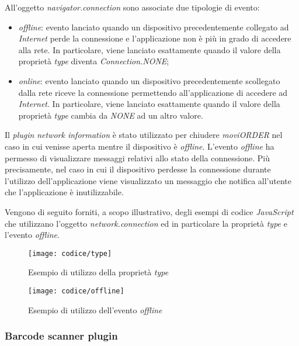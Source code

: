 All'oggetto \textit{navigator.connection} sono associate due tipologie di evento:
\begin{itemize}
	\item \textit{offline}: evento lanciato quando un dispositivo precedentemente collegato ad \textit{Internet} perde la connessione e l'applicazione non è più in grado di accedere alla rete. In particolare, viene lanciato esattamente quando il valore della proprietà \textit{type} diventa \textit{Connection.NONE};
	\item \textit{online}: evento lanciato quando un dispositivo precedentemente scollegato dalla rete riceve la connessione permettendo all'applicazione di accedere ad \textit{Internet}. In particolare, viene lanciato esattamente quando il valore della proprietà \textit{type} cambia da \textit{NONE} ad un altro valore.
\end{itemize}
Il \textit{plugin} \textit{network information} è stato utilizzato per chiudere \textit{moviORDER} nel caso in cui venisse aperta mentre il dispositivo è \textit{offline}. L'evento \textit{offline} ha permesso di visualizzare messaggi relativi allo stato della connessione. Più precisamente, nel caso in cui il dispositivo perdesse la connessione durante l'utilizzo dell'applicazione viene visualizzato un messaggio che notifica all'utente che l'applicazione è inutilizzabile.

Vengono di seguito forniti, a scopo illustrativo, degli esempi di codice \textit{JavaScript} che utilizzano l'oggetto \textit{network.connection} ed in particolare la proprietà \textit{type} e l'evento \textit{offline}.

\begin{figure}[!h] 
    \centering 
    \texttt{[image: codice/type]} 
    \caption{Esempio di utilizzo della proprietà \textit{type}}
\end{figure}

\begin{figure}[!h] 
    \centering 
    \texttt{[image: codice/offline]} 
    \caption{Esempio di utilizzo dell'evento \textit{offline}}
\end{figure}

\subsubsection{Barcode scanner plugin}

